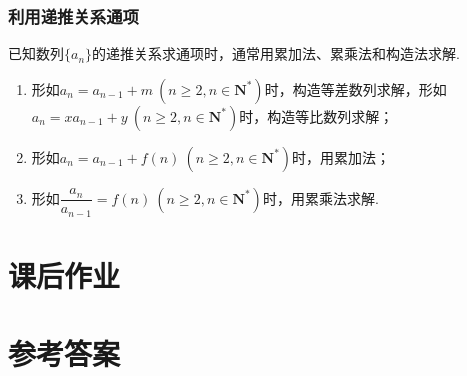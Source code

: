   \subsubsection{利用递推关系通项}
  已知数列$\{a_n\}$的递推关系求通项时，通常用累加法、累乘法和构造法求解.
  \begin{enumerate}
  \item 形如$ a_n=a_{n-1}+m~ (n\ge 2,n\in\mathbf{N^*})$时，构造等差数列求解，形如$ a_n=xa_{n-1}+y~(n\ge2,n\in\mathbf{N^*}) $时，构造等比数列求解；
  \item 形如$ a_n=a_{n-1} +f(n)~(n\ge 2,n\in\mathbf{N^*})$时，用累加法；
  \item 形如$ \dfrac{a_n}{a_{n-1}}=f(n) ~(n\ge 2,n\in\mathbf{N^*})$时，用累乘法求解.
  \end{enumerate}
\newpage
\section{课后作业}
  \begin{exercise}

  \end{exercise}
\stopexercise

\newpage
\section{参考答案}
\begin{multicols}{2}
  \printanswer
\end{multicols}
